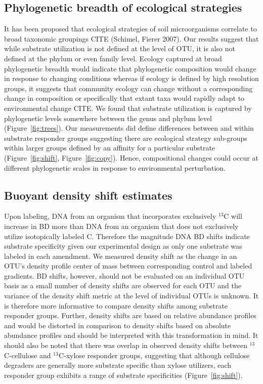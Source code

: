 \subsection{Phylogenetic breadth of ecological strategies}
It has been proposed that ecological strategies of soil microorganisms
correlate to broad taxonomic groupings CITE (Schimel, Fierer 2007). Our
results suggest that while substrate utilization is not defined at the level of
OTU, it is also not defined at the phylum or even family level. Ecology
captured at broad phylogenetic breadth would indicate that phylogenetic
composition would change in response to changing conditions whereas if ecology
is defined by high resolution groups, it suggests that community ecology can
change without a corresponding change in composition or specifically that
extant taxa would rapidly adapt to environmental change CITE. We found that
substrate utilization is captured by phylogenetic levels somewhere between the
genus and phylum level (Figure~\ref{fig:trees}). Our measurements did define
differences between and within substrate responder groups suggesting there are
ecological strategy sub-groups within larger groups defined by an affinity
for a particular substrate (Figure~\ref{fig:shift},
Figure~\ref{fig:copy}). Hence, compositional changes could occur at
different phylogenetic scales in response to environmental perturbation. 

\subsection{Buoyant density shift estimates}
Upon labeling, DNA from an organism that incorporates exclusively $^{13}$C will
increase in BD more than DNA from an organism that does not exclusively utilize
isotopically labeled C. Therefore the magnitude DNA BD shifts indicate
substrate specificity given our experimental design as only one substrate was
labeled in each amendment. We measured density shift as the change in an OTU's
density profile center of mass between corresponding control and labeled
gradients. BD shifts, however, should not be evaluated on an individual OTU
basis as a small number of density shifts are observed for each OTU and the
variance of the density shift metric at the level of individual OTUs is
unknown. It is therefore more informative to compare density shifts among
substrate responder groups. Further, density shifts are based on relative
abundance profiles and would be distorted in comparison to density shifts based
on absolute abundance profiles and should be interpreted with this
transformation in mind. It should also be noted that there was overlap in
observed density shifts between $^{13}$C-cellulose and $^{13}$C-xylose
responder groups, suggesting that although cellulose degraders are generally
more substrate specific than xylose utilizers, each responder group
exhibits a range of substrate specificities (Figure~\ref{fig:shift}). 

